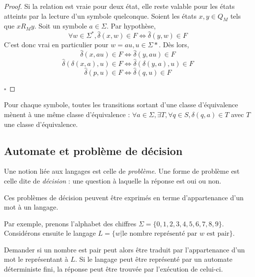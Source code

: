 	 \begin{proof}
	 	Si la relation est vraie pour deux état, elle reste valable pour les états atteints par la lecture d'un symbole quelconque. Soient les états $x,y \in Q_M$ tels que $xR_My$. Soit un symbole $a \in \Sigma$. Par hypothèse, 
	 	$$\forall w \in \Sigma^*, \hat{\delta}(x, w) \in F \iff \hat{\delta}(y, w) \in F$$
	 	C'est donc vrai en particulier pour $w = au, u \in \Sigma*$. Dès lors,
	 	$$\hat{\delta}(x, au) \in F\iff \hat{\delta}(y, au)\in F$$
	 	$$\hat{\delta}(\delta(x,a),u) \in F\iff\hat{\delta}(\delta(y,a),u)\in F$$
	 	$$\hat{\delta}(p,u) \in F\iff \hat{\delta}(q,u)\in F$$

	\hfill$\square$	 
 \end{proof}
 
 	\begin{corollary}\label{col:st}
 		Pour chaque symbole, toutes les transitions sortant d'une classe d'équivalence mènent à une même classe d'équivalence :
 		$\forall a \in \Sigma, \exists T, \forall q \in S, \delta(q,a)\in T$ avec $T$ une classe d'équivalence.
 	\end{corollary}
	 
	 
	 \subsection{Automate et problème de décision}
	 
	 Une notion liée aux langages est celle de \emph{problème}. Une forme de problème est celle dite de \emph{décision} : une question à laquelle la réponse est oui ou non.
	 
	 Ces problèmes de décision peuvent être exprimés en terme d'appartenance d'un mot à un langage.
	 
	 Par exemple, prenons l'alphabet des chiffres $\Sigma=\{0,1,2,3,4,5,6,7,8,9\}$. Considérons ensuite le langage $L = \{w | \text{le nombre représenté par } w \text{ est pair}\}$.
	 
	 Demander si un nombre est pair peut alors être traduit par l'appartenance d'un mot le représentant à $L$. Si le langage peut être représenté par un automate déterministe fini, la réponse peut être trouvée par l'exécution de celui-ci.
	 
	 
	 
	 
